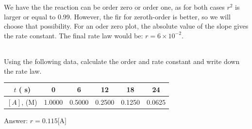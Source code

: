 \documentclass[main.tex]{subfiles}
\begin{document}
\begin{description}
\begin{example}
\begin{minipage}[b]{1.0\linewidth}\end{minipage}
We have the the reaction can be order zero or order one, as for both cases $r^2$ is larger or equal to 0.99. However, the fir for zeroth-order is better, so we will choose that possibility. For an oder zero plot, the absolute value of the slope gives the rate constant. The final rate law would be: $r=6\times 10^{-2}$.

\faDiamond\ \\
Using the following data, calculate the order and rate constant and write down the rate law.
\begin{center}\begin{tabular}[t]{   c|  c cccc  }
\toprule
  $t$ ( s)	&  0	&6	&12	&18	&24	 \\
  \midrule
  $[A]$, (M)&1.0000	&0.5000	&0.2500	&0.1250	 &0.0625	\\
\bottomrule
\end{tabular}\end{center}
\flushright Answer:  $r=0.115\text{[A]}$
\end{example}%



\end{description}
\end{document}
